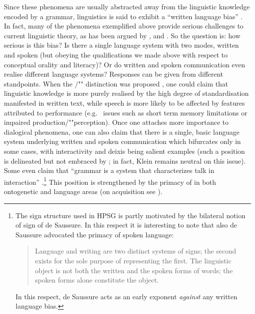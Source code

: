 \documentclass[output=paper
 	        ,biblatex
                ,babelshorthands
                ,newtxmath
                ,draftmode
                ,colorlinks, citecolor=brown
]{langscibook}
\begin{document}
Since these phenomena are usually abstracted away from the linguistic knowledge encoded by a grammar, linguistics is said to exhibit a \enquote{written language bias} \citep{Linell:2005}.
%
In fact, many of the phenomena exemplified above provide serious challenges  to current  linguistic theory, as has been argued by \citet{Ginzburg:2012}, \citet{Ginzburg:Poesio:2016} and \citet{Kempson:Cann:Gregoromichelaki:Chatzikyriakidis:2016}.
%
So the question is: how serious is this bias? 
%
Is there a single language system with two modes, written and spoken (but obeying the qualifications we made above with respect to conceptual orality and literacy)?
%
Or do written and spoken communication even realise different language systems?
%
Responses can be given from different standpoints. 
%
When the /""  distinction was proposed \citep{Chomsky:1969}, one could claim that linguistic knowledge is more purely realised by the high degree of standardisation manifested in written text, while speech is more likely to be affected by features attributed to performance (e.g.\   issues such as short term memory limitations or impaired production/""perception).
%
Once one attaches more importance to dialogical phenomena, one can also claim that there is a single, basic language system underlying written and spoken communication which bifurcates only in some cases, with interactivity and deixis being salient examples (such a position is delineated but not embraced by ; in fact, Klein remains neutral on this issue). 
%
Some even claim that \enquote{grammar is a system that characterizes talk in interaction} \citep[]{Ginzburg:Poesio:2016}.\footnote{The sign structure used in HPSG is partly motivated by the bilateral notion of sign of de Saussure. In this respect it is interesting to note that also de Saussure advocated the primacy of spoken language:
\begin{quote}
Language and writing are two distinct systems of signs; the second exists for the sole purpose of
representing the first. The linguistic object is not both the written and the spoken forms of words;
the spoken forms alone constitute the object.  \citep[\psq]{Saussure2011a}
\end{quote}
In this respect, de Saussure acts as an early exponent \emph{against} any written language bias.
}
%
This position is strengthened by the primacy of  in both ontogenetic and language  areas (on acquisition see ).
\end{document}
